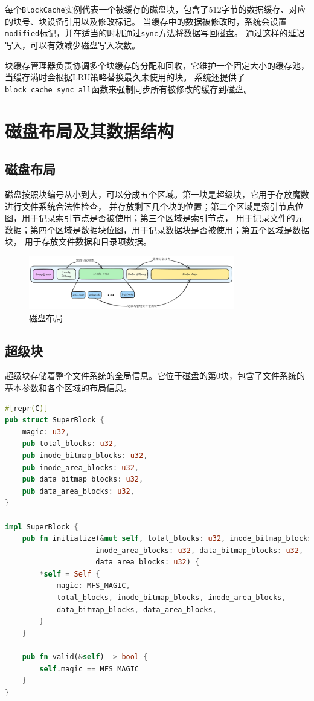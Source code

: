 每个\texttt{BlockCache}实例代表一个被缓存的磁盘块，包含了512字节的数据缓存、对应的块号、块设备引用以及修改标记。
当缓存中的数据被修改时，系统会设置\texttt{modified}标记，并在适当的时机通过\texttt{sync}方法将数据写回磁盘。
通过这样的延迟写入，可以有效减少磁盘写入次数。

块缓存管理器负责协调多个块缓存的分配和回收，它维护一个固定大小的缓存池，当缓存满时会根据LRU策略替换最久未使用的块。
系统还提供了\texttt{block\_cache\_sync\_all}函数来强制同步所有被修改的缓存到磁盘。

\section{磁盘布局及其数据结构}

\subsection{磁盘布局}

磁盘按照块编号从小到大，可以分成五个区域。第一块是超级块，它用于存放魔数进行文件系统合法性检查，
并存放剩下几个块的位置；第二个区域是索引节点位图，用于记录索引节点是否被使用；第三个区域是索引节点，
用于记录文件的元数据；第四个区域是数据块位图，用于记录数据块是否被使用；第五个区域是数据块，
用于存放文件数据和目录项数据。

\begin{figure}[htbp]
    \centering
    \includegraphics[width=0.8\textwidth]{../image/文件系统磁盘结构.png}
    \caption{磁盘布局}
    \label{fig:disk-layout}
\end{figure}

\subsection{超级块}

超级块存储着整个文件系统的全局信息。它位于磁盘的第0块，包含了文件系统的基本参数和各个区域的布局信息。

\begin{lstlisting}[language=Rust]
#[repr(C)]
pub struct SuperBlock {
    magic: u32,
    pub total_blocks: u32,
    pub inode_bitmap_blocks: u32,
    pub inode_area_blocks: u32,
    pub data_bitmap_blocks: u32,
    pub data_area_blocks: u32,
}

impl SuperBlock {
    pub fn initialize(&mut self, total_blocks: u32, inode_bitmap_blocks: u32,
                     inode_area_blocks: u32, data_bitmap_blocks: u32,
                     data_area_blocks: u32) {
        *self = Self {
            magic: MFS_MAGIC,
            total_blocks, inode_bitmap_blocks, inode_area_blocks,
            data_bitmap_blocks, data_area_blocks,
        }
    }

    pub fn valid(&self) -> bool {
        self.magic == MFS_MAGIC
    }
}
\end{lstlisting}

